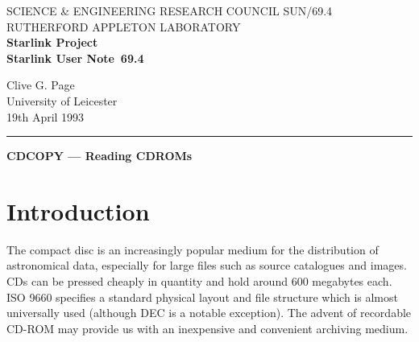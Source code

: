 \pagestyle{myheadings}

\newcommand{\stardoccategory}  {Starlink User Note}
\newcommand{\stardocinitials}  {SUN}
\newcommand{\stardocnumber}    {69.4}
\newcommand{\stardocauthors}   {Clive G. Page\\University of Leicester}
\newcommand{\stardocdate}      {19th April 1993}
\newcommand{\stardoctitle}     {CDCOPY --- Reading CDROMs}

\newcommand{\stardocname}{\stardocinitials /\stardocnumber}
\renewcommand{\_}{{\tt\char'137}}     %
\markright{\stardocname}
\setlength{\textwidth}{160mm}
\setlength{\textheight}{230mm}
\setlength{\topmargin}{-2mm}
\setlength{\oddsidemargin}{0mm}
\setlength{\evensidemargin}{0mm}
\setlength{\parindent}{0mm}
\setlength{\parskip}{\medskipamount}
\setlength{\unitlength}{1mm}



\thispagestyle{empty}
SCIENCE \& ENGINEERING RESEARCH COUNCIL \hfill \stardocname\\
RUTHERFORD APPLETON LABORATORY\\
{\large\bf Starlink Project\\}
{\large\bf \stardoccategory\ \stardocnumber}
\begin{flushright}
\stardocauthors\\
\stardocdate
\end{flushright}
\vspace{-4mm}
\rule{\textwidth}{0.5mm}
\vspace{5mm}
\begin{center}
{\Large\bf \stardoctitle}
\end{center}
\vspace{5mm}

\section{Introduction}

The compact disc is an increasingly popular medium for the distribution
of astronomical data, especially for large files such as source
catalogues and images. CDs can be pressed cheaply in quantity and hold
around 600 megabytes each.  ISO 9660 specifies a standard physical
layout and file structure which is almost universally used (although DEC 
is a notable exception). The advent of recordable CD-ROM may provide us
with an inexpensive and convenient archiving medium. 

